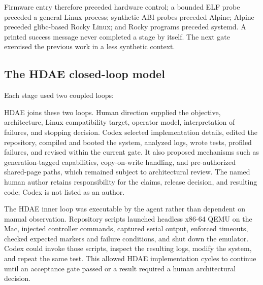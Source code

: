 \documentclass[11pt]{article}
\begin{document}
Firmware entry therefore preceded hardware control; a bounded ELF probe
preceded a general Linux process; synthetic ABI probes preceded Alpine; Alpine
preceded glibc-based Rocky Linux; and Rocky programs preceded systemd. A printed
success message never completed a stage by itself. The next gate exercised the
previous work in a less synthetic context.

\subsection{The HDAE closed-loop model}

Each stage used two coupled loops:

\begin{center}
\end{center}

HDAE joins these two loops. Human direction supplied the objective,
architecture, Linux compatibility
target, operator model, interpretation of failures, and stopping decision.
Codex selected implementation details, edited the repository, compiled and
booted the system, analyzed logs, wrote tests, profiled failures, and revised
within the current gate. It also proposed mechanisms such as
generation-tagged capabilities, copy-on-write handling, and pre-authorized
shared-page paths, which remained subject to architectural review.
The named human author retains responsibility for the claims, release decision,
and resulting code; Codex is not listed as an author.

The HDAE inner loop was executable by the agent rather than dependent on manual
observation. Repository scripts launched headless x86-64 QEMU on the Mac,
injected controller commands, captured serial output, enforced timeouts, checked
expected markers and failure conditions, and shut down the emulator. Codex
could invoke those scripts, inspect the resulting logs, modify the system, and
repeat the same test. This allowed HDAE implementation cycles to continue until an
acceptance gate passed or a result required a human architectural decision.
\end{document}
